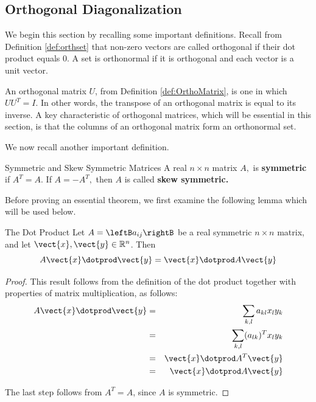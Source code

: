 \subsection{Orthogonal Diagonalization}

We begin this section by recalling some important definitions. Recall from Definition \ref{def:orthset} that non-zero vectors are called orthogonal if their dot product equals $0$.  A set is orthonormal if it is orthogonal and each vector is a unit vector. 

An orthogonal matrix $U$, from Definition \ref{def:OrthoMatrix}, is one in which $UU^{T} = I$. In other words, the transpose of an orthogonal matrix is equal to its inverse. A key characteristic of orthogonal matrices, which will be essential in this section, is that the columns of an orthogonal matrix form an orthonormal set. 

We now recall another important definition. 

\begin{definition}{Symmetric and Skew Symmetric Matrices}\label{def:symmetricskewmatrices}
A real $n\times n$ matrix $A,$ is \textbf{symmetric }if $A^{T}=A.$ If $%
A=-A^{T},$ then $A$ is called \textbf{skew symmetric. }
\end{definition}

Before proving an essential theorem, we first examine the following lemma which will be used below.

\begin{lemma}{The Dot Product}\label{lem:dotprodlemma}
Let $A=\leftB a_{ij} \rightB$ be a real symmetric $n \times n$ matrix, and let $\vect{x}, \vect{y} \in \mathbb{R}^n$. Then
\[
A\vect{x} \dotprod \vect{y} = \vect{x} \dotprod A \vect{y}
\]
\end{lemma}

\begin{proof}
This result follows from the definition of the dot product together with properties of matrix multiplication, as follows:
\begin{eqnarray*}
A\vect{x} \dotprod \vect{y} &=& \sum_{k,l}a_{kl}x_{l}y_{k} \\
&=&\sum_{k,l} (a_{lk})^Tx_{l}y_{k} \\
&=& \vect{x}\dotprod A^{T}\vect{y} \\
&=& \vect{x}\dotprod A \vect{y}
\end{eqnarray*}

The last step follows from $A^T = A$, since $A$ is symmetric. 
\end{proof}

